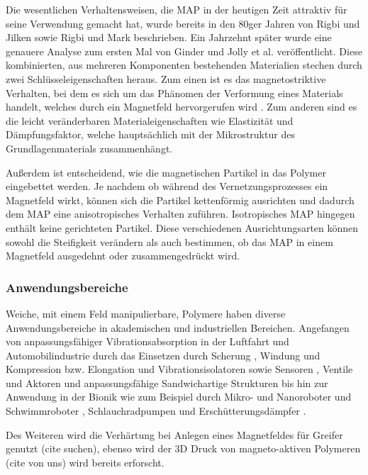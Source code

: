 Die wesentlichen Verhaltensweisen, die MAP in der heutigen Zeit attraktiv für seine Verwendung gemacht hat, wurde bereits in den 80ger Jahren von Rigbi und Jilken \cite{Rigbi1} sowie Rigbi und Mark \cite{Rigbi2} beschrieben. Ein Jahrzehnt später wurde eine genauere Analyse zum ersten Mal von Ginder und Jolly et al. \cite{ginder} veröffentlicht. 
Diese kombinierten, aus mehreren Komponenten bestehenden Materialien stechen durch zwei Schlüsseleigenschaften heraus. 
Zum einen ist es das magnetostriktive Verhalten, bei dem es sich um das Phänomen der Verformung eines Materials handelt, welches durch ein Magnetfeld hervorgerufen wird \cite{Martin_2006}.
Zum anderen sind es die leicht veränderbaren Materialeigenschaften wie Elastizität und Dämpfungsfaktor, welche hauptsächlich mit der Mikrostruktur des Grundlagenmaterials zusammenhängt. \cite{Varga1} \cite{Varga2}

Außerdem ist entscheidend, wie die magnetischen Partikel in das Polymer eingebettet werden. Je nachdem ob während des Vernetzungsprozesses ein Magnetfeld wirkt, können sich die Partikel kettenförmig ausrichten und dadurch dem MAP eine anisotropisches Verhalten zuführen. Isotropisches MAP hingegen enthält keine gerichteten Partikel. Diese verschiedenen Ausrichtungsarten können sowohl die Steifigkeit verändern als auch bestimmen, ob das MAP in einem Magnetfeld ausgedehnt oder zusammengedrückt wird. 
\subsubsection*{Anwendungsbereiche}
Weiche, mit einem Feld manipulierbare, Polymere haben diverse Anwendungsbereiche in akademischen und industriellen Bereichen. Angefangen von anpassungsfähiger Vibrationsabsorption in der Luftfahrt und Automobilindustrie durch das Einsetzen durch Scherung \cite{Ginder_Schlotter_Nichols} \cite{Deng_Gong}, Windung \cite{Hoang_Zhang_Li_Du} und Kompression bzw. Elongation \cite{Kallio_2007} und Vibrationsisolatoren \cite{Ginder_2000} sowie Sensoren \cite{Ginder_2000} \cite{Martin_2006}, Ventile und Aktoren \cite{Boese_2012} \cite{Keip_2014} und anpassungsfähige Sandwichartige Strukturen \cite{Zhou_2005} \cite{Zhou_2006} \cite{Wei_2008} bis hin zur Anwendung in der Bionik wie zum Beispiel durch Mikro- und Nanoroboter und Schwimmroboter \cite{Qiu_2015} \cite{Xu_2015} \cite{Lum_2016} \cite{Hu_2018}, Schlauchradpumpen \cite{Fuhrer_2013} und Erschütterungsdämpfer \cite{Li_2013}.

Des Weiteren wird die Verhärtung bei Anlegen eines Magnetfeldes für Greifer genutzt (cite suchen), ebenso wird der 3D Druck von magneto-aktiven Polymeren (cite von uns) wird bereits erforscht.

